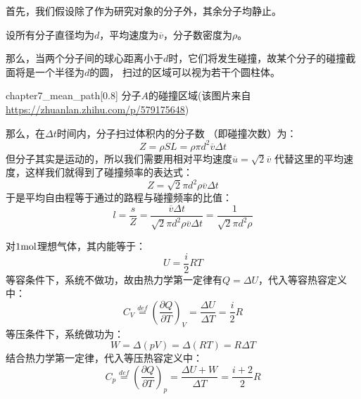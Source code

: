         \begin{prove}
            首先，我们假设除了作为研究对象的分子外，其余分子均静止。
            
            设所有分子直径均为$d$，平均速度为$\overline{v}$，分子数密度为$\rho$。
            
            那么，当两个分子间的球心距离小于$d$时，它们将发生碰撞，故某个分子的碰撞截面将是一个半径为$d$的圆，
            扫过的区域可以视为若干个圆柱体。
            \begin{singlefigure}{chapter7_mean_path}[0.8]
            	分子$A$的碰撞区域(该图片来自\url{https://zhuanlan.zhihu.com/p/579175648})
            \end{singlefigure}
            那么，在$\Delta t$时间内，分子扫过体积内的分子数 （即碰撞次数）为：
            \begin{equation}
                Z =\rho SL =\rho \pi d^{2} \overline{v} \Delta t
                \nonumber
            \end{equation}
            但分子其实是运动的，所以我们需要用相对平均速度$\overline{u} = \sqrt{2}\overline{v}$
            代替这里的平均速度，这样我们就得到了碰撞频率的表达式：
            \begin{equation}
                Z =\sqrt{2}\pi d^{2} \rho \overline{v} \Delta t
            \end{equation}
            于是平均自由程等于通过的路程与碰撞频率的比值：
            \begin{equation}
                l = \frac{s}{Z} = \frac{\overline{v}\Delta t }{\sqrt{2}\pi d^{2} \rho \overline{v} \Delta t} = \frac{1}{\sqrt{2}\pi d^{2} \rho}
            \end{equation}
        \end{prove}
        \begin{prove}
            对$1\rm{mol}$理想气体，其内能等于：
            \begin{equation}
                U = \frac{i}{2}RT
                \nonumber
            \end{equation}
            等容条件下，系统不做功，故由热力学第一定律有$Q = \Delta U$，代入等容热容定义中：
            \begin{equation}
                C_{V} \overset{def}{=} \left(\frac{\partial{Q}}{\partial{T}}\right)_{V} =\frac{\Delta U}{\Delta T}
                =\frac{i}{2}R
            \end{equation}
            等压条件下，系统做功为：
            \begin{equation}
                W = \Delta (pV) = \Delta (RT) =  R\Delta T
                \nonumber
            \end{equation}
            结合热力学第一定律，代入等压热容定义中：
            \begin{equation}
                C_{p} \overset{def}{=} \left(\frac{\partial{Q}}{\partial{T}}\right)_{p} = \frac{\Delta U + W}{\Delta T} 
                = \frac{i+2}{2}R
            \end{equation}
        \end{prove}
